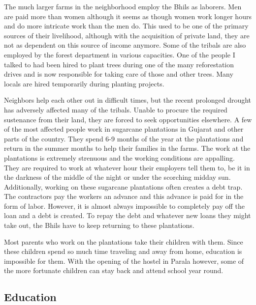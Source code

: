 \documentclass[report.tex]{subfiles}
\begin{document}
The much larger farms in the neighborhood employ the Bhils as laborers. Men are paid more than women although it seems as though women work longer hours and do more intricate work than the men do. This used to be one of the primary sources of their livelihood, although with the acquisition of private land, they are not as dependent on this source of income anymore. Some of the tribals are also employed by the forest department in various capacities. One of the people I talked to had been hired to plant trees during one of the many reforestation drives and is now responsible for taking care of those and other trees. Many locals are hired temporarily during planting projects.

Neighbors help each other out in difficult times, but the recent prolonged drought has adversely affected many of the tribals. Unable to procure the required sustenance from their land, they are forced to seek opportunities elsewhere. A few of the most affected people work in sugarcane plantations in Gujarat and other parts of the country. They spend 6-9 months of the year at the plantations and return in the summer months to help their families in the farms. The work at the plantations is extremely strenuous and the working conditions are appalling. They are required to work at whatever hour their employers tell them to, be it in the darkness of the middle of the night or under the scorching midday sun. Additionally, working on these sugarcane plantations often creates a debt trap. The contractors pay the workers an advance and this advance is paid for in the form of labor. However, it is almost always impossible to completely pay off the loan and a debt is created. To repay the debt and whatever new loans they might take out, the Bhils have to keep returning to these plantations.

Most parents who work on the plantations take their children with them. Since these children spend so much time traveling and away from home, education is impossible for them. With the opening of the hostel in Parala however, some of the more fortunate children can stay back and attend school year round.

\subsection{Education}
\end{document}

